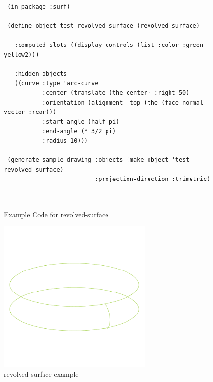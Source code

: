 \documentclass [11pt]{book}
\begin{document}
\begin{itemize}
\begin{figure}
\begin{lrbox}{\boxedverb}
\begin{minipage}{\linewidth}
{\begin{verbatim}

 (in-package :surf)

 (define-object test-revolved-surface (revolved-surface)

   :computed-slots ((display-controls (list :color :green-yellow2)))

   :hidden-objects 
   ((curve :type 'arc-curve
           :center (translate (the center) :right 50)
           :orientation (alignment :top (the (face-normal-vector :rear)))
           :start-angle (half pi)
           :end-angle (* 3/2 pi)
           :radius 10)))
 
 (generate-sample-drawing :objects (make-object 'test-revolved-surface)
                          :projection-direction :trimetric)
 
 
\end{verbatim}}
\end{minipage}
\end{lrbox}
\fbox{\usebox{\boxedverb}}

\caption{Example Code for revolved-surface}

\label{fig:example-code-revolved-surface}

\end{figure}

\begin{figure}
\begin{center}
\includegraphics[width=3in,height=3in]{../images/example-revolved-surface.pdf}
\end{center}

\caption{revolved-surface example}

\label{fig:revolved-surface}

\end{figure}






\end{itemize}
\end{document}
